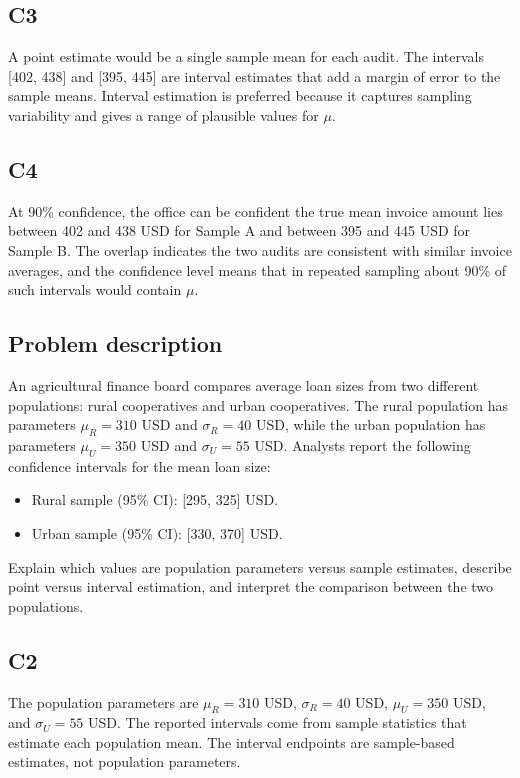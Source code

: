 \begin{ExamProblems}
		\subsection*{C3}
		A point estimate would be a single sample mean for each audit. The intervals [402, 438] and [395, 445] are interval estimates that add a margin of error to the sample means. Interval estimation is preferred because it captures sampling variability and gives a range of plausible values for $\mu$.

		\subsection*{C4}
		At 90\% confidence, the office can be confident the true mean invoice amount lies between 402 and 438 USD for Sample A and between 395 and 445 USD for Sample B. The overlap indicates the two audits are consistent with similar invoice averages, and the confidence level means that in repeated sampling about 90\% of such intervals would contain $\mu$.

		\newpage
		\item
		\subsection*{Problem description}
		An agricultural finance board compares average loan sizes from two different populations: rural cooperatives and urban cooperatives.
		The rural population has parameters $\mu_R = 310$ USD and $\sigma_R = 40$ USD, while the urban population has parameters $\mu_U = 350$ USD and $\sigma_U = 55$ USD.
		Analysts report the following confidence intervals for the mean loan size:

		\begin{itemize}
			\item Rural sample (95\% CI): [295, 325] USD.
			\item Urban sample (95\% CI): [330, 370] USD.
		\end{itemize}

		Explain which values are population parameters versus sample estimates, describe point versus interval estimation, and interpret the comparison between the two populations.

		\subsection*{C2}
		The population parameters are $\mu_R = 310$ USD, $\sigma_R = 40$ USD, $\mu_U = 350$ USD, and $\sigma_U = 55$ USD. The reported intervals come from sample statistics that estimate each population mean. The interval endpoints are sample-based estimates, not population parameters.


\end{ExamProblems}
